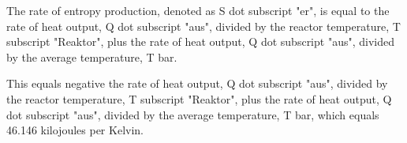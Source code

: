 The rate of entropy production, denoted as S dot subscript "er", is equal to the rate of heat output, Q dot subscript "aus", divided by the reactor temperature, T subscript "Reaktor", plus the rate of heat output, Q dot subscript "aus", divided by the average temperature, T bar.

This equals negative the rate of heat output, Q dot subscript "aus", divided by the reactor temperature, T subscript "Reaktor", plus the rate of heat output, Q dot subscript "aus", divided by the average temperature, T bar, which equals 46.146 kilojoules per Kelvin.